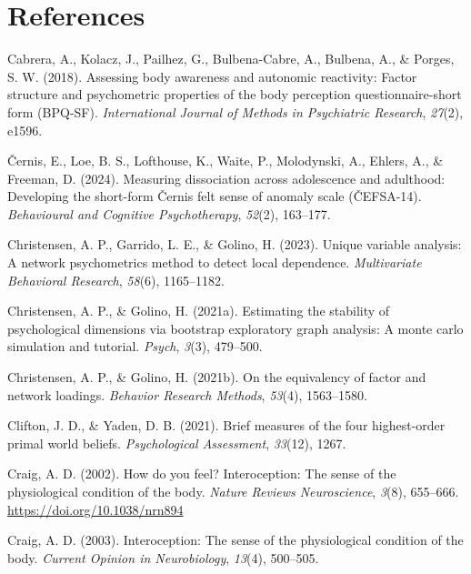 \documentclass[
  jou,
  floatsintext,
  longtable,
  nolmodern,
  notxfonts,
  notimes,
  colorlinks=true,linkcolor=blue,citecolor=blue,urlcolor=blue]{apa7}
\newlength{\cslhangindent}
\newenvironment{CSLReferences}[2] %
 {\begin{list}{}{%
  \setlength{\itemindent}{0pt}
  \setlength{\leftmargin}{0pt}
  \setlength{\parsep}{0pt}
  \ifodd #1
   \setlength{\leftmargin}{\cslhangindent}
   \setlength{\itemindent}{-1\cslhangindent}
  \fi
  \setlength{\itemsep}{#2\baselineskip}}}
 {\end{list}}
\begin{document}
\section{References}\label{references}

\label{refs}
\begin{CSLReferences}{1}{0}
Cabrera, A., Kolacz, J., Pailhez, G., Bulbena-Cabre, A., Bulbena, A., \&
Porges, S. W. (2018). Assessing body awareness and autonomic reactivity:
Factor structure and psychometric properties of the body perception
questionnaire-short form (BPQ-SF). \emph{International Journal of
Methods in Psychiatric Research}, \emph{27}(2), e1596.

Černis, E., Loe, B. S., Lofthouse, K., Waite, P., Molodynski, A.,
Ehlers, A., \& Freeman, D. (2024). Measuring dissociation across
adolescence and adulthood: Developing the short-form {Č}ernis felt sense
of anomaly scale ({Č}EFSA-14). \emph{Behavioural and Cognitive
Psychotherapy}, \emph{52}(2), 163--177.

Christensen, A. P., Garrido, L. E., \& Golino, H. (2023). Unique
variable analysis: A network psychometrics method to detect local
dependence. \emph{Multivariate Behavioral Research}, \emph{58}(6),
1165--1182.

Christensen, A. P., \& Golino, H. (2021a). Estimating the stability of
psychological dimensions via bootstrap exploratory graph analysis: A
monte carlo simulation and tutorial. \emph{Psych}, \emph{3}(3),
479--500.

Christensen, A. P., \& Golino, H. (2021b). On the equivalency of factor
and network loadings. \emph{Behavior Research Methods}, \emph{53}(4),
1563--1580.

Clifton, J. D., \& Yaden, D. B. (2021). Brief measures of the four
highest-order primal world beliefs. \emph{Psychological Assessment},
\emph{33}(12), 1267.

Craig, A. D. (2002). How do you feel? Interoception: The sense of the
physiological condition of the body. \emph{Nature Reviews Neuroscience},
\emph{3}(8), 655--666. \url{https://doi.org/10.1038/nrn894}

Craig, A. D. (2003). Interoception: The sense of the physiological
condition of the body. \emph{Current Opinion in Neurobiology},
\emph{13}(4), 500--505.


\end{CSLReferences}
\end{document}
